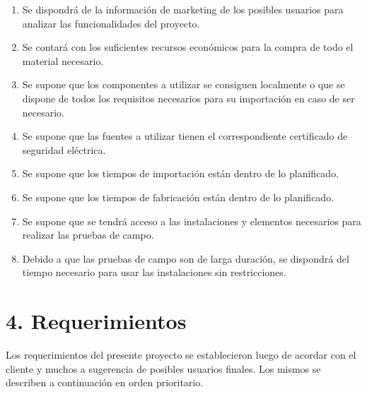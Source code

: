 \documentclass[11pt]{charter}
\begin{document}
\begin{enumerate}
\item Se dispondrá de la información de marketing de los posibles usuarios para analizar las funcionalidades del proyecto.
\item Se contará con los suficientes recursos económicos para la compra de todo el material necesario.
\item Se supone que los componentes a utilizar se consiguen localmente o que se dispone de todos los requisitos necesarios para su importación en caso de ser necesario.
\item Se supone que las fuentes a utilizar tienen el correspondiente certificado de seguridad eléctrica.
\item Se supone que los tiempos de importación están dentro de lo planificado.
\item Se supone que los tiempos de fabricación están dentro de lo planificado.
\item Se supone que se tendrá acceso a las instalaciones y elementos necesarios para realizar las pruebas de campo.
\item Debido a que las pruebas de campo son de larga duración, se dispondrá del tiempo necesario para usar las instalaciones sin restricciones.

\end{enumerate}


\section{4. Requerimientos}
\label{sec:requerimientos}

Los requerimientos del presente proyecto se establecieron luego de acordar con el cliente y muchos a sugerencia de posibles usuarios finales. Los mismos se describen a continuación en orden prioritario.
\end{document}
